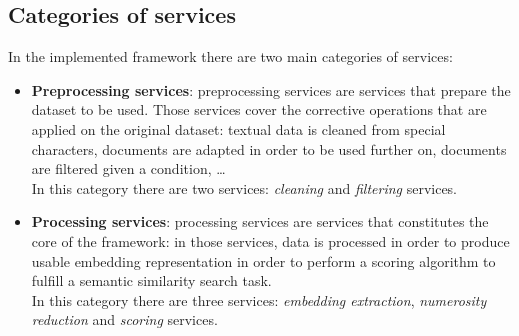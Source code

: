 \documentclass[\main/main.tex]{subfiles}
\begin{document}
\subsection{Categories of services}
In the implemented framework there are two main categories of services:
\begin{itemize}
    \item \textbf{Preprocessing services}: preprocessing services are services that prepare the dataset to be used. Those services cover the corrective operations that are applied on the original dataset: textual data is cleaned from special characters, documents are adapted in order to be used further on, documents are filtered given a condition, \dots  \\
    In this category there are two services: \emph{cleaning} and \emph{filtering} services.
    \item \textbf{Processing services}: processing services are services that constitutes the core of the framework: in those services, data is processed in order to produce usable embedding representation in order to perform a scoring algorithm to fulfill a semantic similarity search task. \\
    In this category there are three services: \emph{embedding extraction}, \emph{numerosity reduction} and \emph{scoring} services.
\end{itemize}
\end{document}

